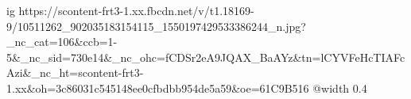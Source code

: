  
 
 
 
 

\ifcmt
  ig https://scontent-frt3-1.xx.fbcdn.net/v/t1.18169-9/10511262_902035183154115_1550197429533386244_n.jpg?_nc_cat=106&ccb=1-5&_nc_sid=730e14&_nc_ohc=fCDSr2eA9JQAX_BaAYz&tn=lCYVFeHcTIAFcAzi&_nc_ht=scontent-frt3-1.xx&oh=3c86031c545148ee0cfbdbb954de5a59&oe=61C9B516
  @width 0.4
\fi
